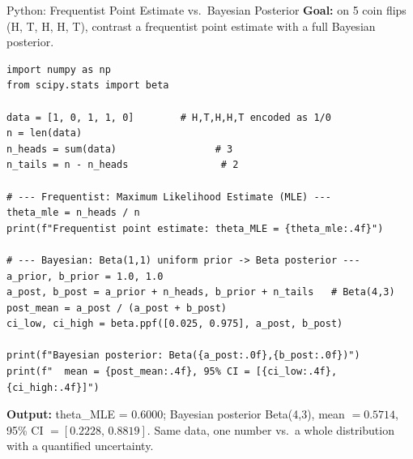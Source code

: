 \documentclass[aspectratio=169,10pt]{beamer}
\begin{document}
\begin{frame}[fragile]{Python: Frequentist Point Estimate vs.\ Bayesian Posterior}
  \textbf{Goal:} on 5 coin flips (H, T, H, H, T), contrast a frequentist
  point estimate with a full Bayesian posterior.
  \begin{lstlisting}
import numpy as np
from scipy.stats import beta

data = [1, 0, 1, 1, 0]        # H,T,H,H,T encoded as 1/0
n = len(data)
n_heads = sum(data)                 # 3
n_tails = n - n_heads                # 2

# --- Frequentist: Maximum Likelihood Estimate (MLE) ---
theta_mle = n_heads / n
print(f"Frequentist point estimate: theta_MLE = {theta_mle:.4f}")

# --- Bayesian: Beta(1,1) uniform prior -> Beta posterior ---
a_prior, b_prior = 1.0, 1.0
a_post, b_post = a_prior + n_heads, b_prior + n_tails   # Beta(4,3)
post_mean = a_post / (a_post + b_post)
ci_low, ci_high = beta.ppf([0.025, 0.975], a_post, b_post)

print(f"Bayesian posterior: Beta({a_post:.0f},{b_post:.0f})")
print(f"  mean = {post_mean:.4f}, 95% CI = [{ci_low:.4f}, {ci_high:.4f}]")
  \end{lstlisting}
  \textbf{Output:} {\ttfamily theta\_MLE = 0.6000}; Bayesian posterior
  {\ttfamily Beta(4,3)}, mean $=0.5714$, 95\% CI $=[0.2228,\,0.8819]$. Same
  data, one number vs.\ a whole distribution with a quantified uncertainty.
\end{frame}
\end{document}
